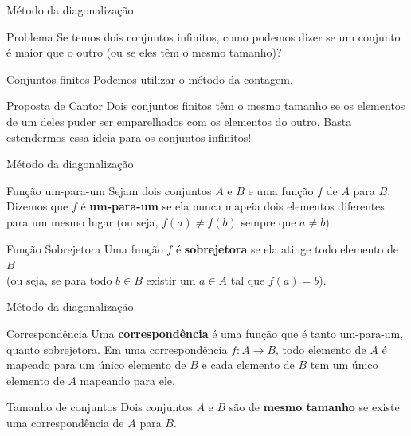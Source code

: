 \documentclass[xcolor=dvipsnames,table]{beamer}
\begin{document}
	\begin{frame}{Método da diagonalização}
		\begin{alertblock}{Problema}
			Se temos dois conjuntos infinitos, como podemos dizer se um conjunto é maior que o outro (ou se eles têm o mesmo tamanho)?
		\end{alertblock} \pause
		\begin{block}{Conjuntos finitos}
			Podemos utilizar o método da contagem.
		\end{block} \pause
		\begin{exampleblock}{Proposta de Cantor}
			Dois conjuntos finitos têm o mesmo tamanho se os elementos de um deles puder ser emparelhados com os elementos do outro. Basta estendermos essa ideia para os conjuntos infinitos!
		\end{exampleblock}
	\end{frame}

		\begin{frame}{Método da diagonalização}
		\begin{block}{Função um-para-um}
			Sejam dois conjuntos $A$ e $B$ e uma função $f$ de $A$ para $B$. Dizemos que $f$ é {\bf um-para-um} se ela nunca mapeia dois elementos diferentes para um mesmo lugar (ou seja, $f(a) \not= f(b)$ sempre que $a \not= b$).
		\end{block}	\pause	
		\begin{block}{Função Sobrejetora}		
			Uma função $f$ é {\bf sobrejetora} se ela atinge todo elemento de $B$ \\(ou seja, se para todo $b \in B$ existir um $a \in A$ tal que $f(a) = b$).
		\end{block} 
	\end{frame}
	
	\begin{frame}{Método da diagonalização}
		\begin{block}{Correspondência}
			Uma {\bf correspondência} é uma função que é tanto um-para-um, quanto sobrejetora. Em uma correspondência $f : A \rightarrow B$, todo elemento de $A$ é mapeado para um único elemento de $B$ e cada elemento de $B$ tem um único elemento de $A$ mapeando para ele. 
		\end{block} \pause
		\begin{block}{Tamanho de conjuntos}
			Dois conjuntos $A$ e $B$ são de {\bf mesmo tamanho} se existe uma correspondência de $A$ para $B$.
		\end{block}
	\end{frame}
	
\end{document}
